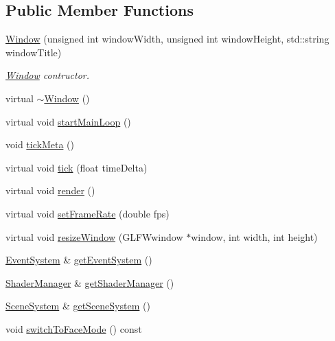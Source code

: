 \subsection*{Public Member Functions}
\begin{DoxyCompactItemize}
\item 
\mbox{\hyperlink{classec_1_1_window_a01bb029fa4964caf70553c5ca806d8cc}{Window}} (unsigned int window\+Width, unsigned int window\+Height, std\+::string window\+Title)
\begin{DoxyCompactList}\small\item\em \mbox{\hyperlink{classec_1_1_window}{Window}} contructor. \end{DoxyCompactList}\item 
virtual \mbox{\hyperlink{classec_1_1_window_a639d3f230ca0e232066b4c61a5a212b7}{$\sim$\+Window}} ()
\item 
virtual void \mbox{\hyperlink{classec_1_1_window_a156a8352f977dd3828e95ab694284359}{start\+Main\+Loop}} ()
\item 
void \mbox{\hyperlink{classec_1_1_window_a0adaafc13d0dafc238aa0aaa0f5f4f82}{tick\+Meta}} ()
\item 
virtual void \mbox{\hyperlink{classec_1_1_window_a093b4989e4cd12cf9e62777ec4ef8661}{tick}} (float time\+Delta)
\item 
virtual void \mbox{\hyperlink{classec_1_1_window_acb066b817adc7c790b0810695078dee3}{render}} ()
\item 
virtual void \mbox{\hyperlink{classec_1_1_window_a6acc36f2c069b5e38f522953ca52ce9f}{set\+Frame\+Rate}} (double fps)
\item 
virtual void \mbox{\hyperlink{classec_1_1_window_a33ef071f4198715ae42844c681fb40eb}{resize\+Window}} (G\+L\+F\+Wwindow $\ast$window, int width, int height)
\item 
\mbox{\hyperlink{classec_1_1_event_system}{Event\+System}} \& \mbox{\hyperlink{classec_1_1_window_a9dda11a247352aa51fea720076174535}{get\+Event\+System}} ()
\item 
\mbox{\hyperlink{classec_1_1_shader_manager}{Shader\+Manager}} \& \mbox{\hyperlink{classec_1_1_window_adc63f54684ad3681c0d4bea8481b6322}{get\+Shader\+Manager}} ()
\item 
\mbox{\hyperlink{classec_1_1_scene_system}{Scene\+System}} \& \mbox{\hyperlink{classec_1_1_window_a13d8cba249c2de0a5366c2507e887290}{get\+Scene\+System}} ()
\item 
void \mbox{\hyperlink{classec_1_1_window_a071d133719298221af21bd2c207733b3}{switch\+To\+Face\+Mode}} () const
\item 

\end{DoxyCompactItemize}
